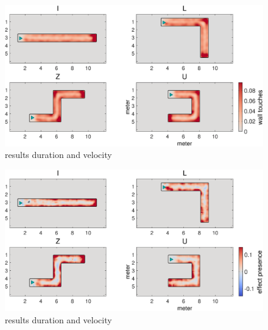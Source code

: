 \begin{figure}[h]
\centering
\includegraphics[width=\linewidth]{figures/wall_touches_mean.eps}
\vspace{0pt}
\caption{results duration and velocity}
\label{results_touches_mean}
\end{figure}

\begin{figure}[h]
\centering
\includegraphics[width=\linewidth]{figures/effect_presence_wall_touches.eps}
\vspace{0pt}
\caption{results duration and velocity}
\label{results_touches_effect}
\end{figure}


